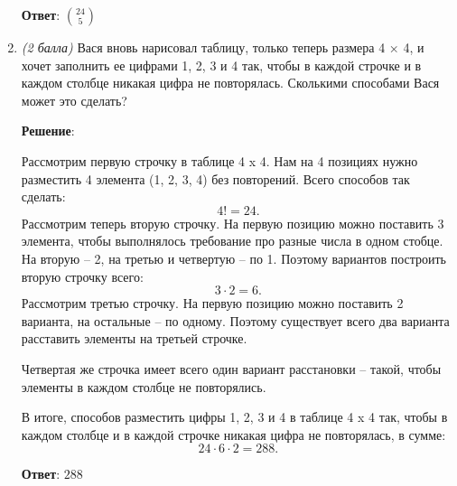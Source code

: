 \documentclass{article}
\begin{document}
\begin{enumerate}
        \textbf{Ответ}:
        $\binom{24}{5}$

        \item \textit{(2 балла)} Вася вновь нарисовал таблицу, только теперь размера 4 × 4, и хочет заполнить ее цифрами 1, 2, 3 и 4 так, чтобы в каждой строчке и в каждом столбце никакая цифра не повторялась. Сколькими способами Вася может это сделать?
        
        \textbf{Решение}:

        Рассмотрим первую строчку в таблице 4 x 4. Нам на 4 позициях нужно разместить 4 элемента (1, 2, 3, 4) без повторений. Всего способов так сделать:
        \begin{equation}
            4! = 24.
        \end{equation}
        Рассмотрим теперь вторую строчку. На первую позицию можно поставить 3 элемента, чтобы выполнялось требование про разные числа в одном стобце. На вторую -- 2, на третью и четвертую -- по 1. Поэтому вариантов построить вторую строчку всего:
        \begin{equation}
            3\cdot 2 = 6.
        \end{equation}
        Рассмотрим третью строчку. На первую позицию можно поставить 2 варианта, на остальные -- по одному. Поэтому существует всего два варианта расставить элементы на третьей строчке.

        Четвертая же строчка имеет всего один вариант расстановки -- такой, чтобы элементы в каждом столбце не повторялись.

        В итоге, способов разместить цифры 1, 2, 3 и 4 в таблице 4 x 4 так, чтобы в каждом столбце и в каждой строчке никакая цифра не повторялась, в сумме:
        \begin{equation}
            24\cdot 6\cdot 2 = 288.
        \end{equation}

        \textbf{Ответ}:
        $288$

    \end{enumerate}
\end{document}
